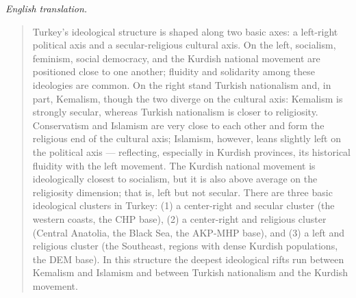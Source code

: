 \emph{English translation.}
\begin{quote}
Turkey's ideological structure is shaped along two basic axes: a left-right
political axis and a secular-religious cultural axis. On the left,
socialism, feminism, social democracy, and the Kurdish national movement are
positioned close to one another; fluidity and solidarity among these
ideologies are common. On the right stand Turkish nationalism and, in part,
Kemalism, though the two diverge on the cultural axis: Kemalism is strongly
secular, whereas Turkish nationalism is closer to religiosity. Conservatism
and Islamism are very close to each other and form the religious end of the
cultural axis; Islamism, however, leans slightly left on the political axis
--- reflecting, especially in Kurdish provinces, its historical fluidity
with the left movement. The Kurdish national movement is ideologically
closest to socialism, but it is also above average on the religiosity
dimension; that is, left but not secular. There are three basic ideological
clusters in Turkey: (1) a center-right and secular cluster (the western
coasts, the CHP base), (2) a center-right and religious cluster (Central
Anatolia, the Black Sea, the AKP-MHP base), and (3) a left and religious
cluster (the Southeast, regions with dense Kurdish populations, the DEM
base). In this structure the deepest ideological rifts run between Kemalism
and Islamism and between Turkish nationalism and the Kurdish movement.
\end{quote}

